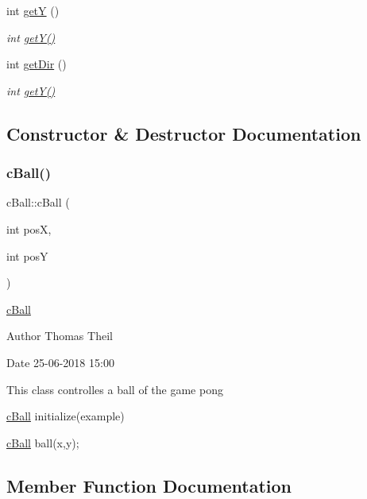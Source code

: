 \begin{DoxyCompactItemize}
int \mbox{\hyperlink{classc_ball_a4439db1ba25e8f69fde4fdf0fa1b4f24}{getY}} ()
\begin{DoxyCompactList}\small\item\em int \mbox{\hyperlink{classc_ball_a4439db1ba25e8f69fde4fdf0fa1b4f24}{get\+Y()}} \end{DoxyCompactList}\item 
int \mbox{\hyperlink{classc_ball_aabb4c1b801ca98f18461f0abebd22e41}{get\+Dir}} ()
\begin{DoxyCompactList}\small\item\em int \mbox{\hyperlink{classc_ball_a4439db1ba25e8f69fde4fdf0fa1b4f24}{get\+Y()}} \end{DoxyCompactList}\end{DoxyCompactItemize}


\subsection{Constructor \& Destructor Documentation}
\mbox{\label{classc_ball_a26865bcbfe3d50d5e938ec29eec791dd}} 
\subsubsection{\texorpdfstring{c\+Ball()}{cBall()}}
{\footnotesize\ttfamily c\+Ball\+::c\+Ball (\begin{DoxyParamCaption}\item[{int}]{posX,  }\item[{int}]{posY }\end{DoxyParamCaption})}



\mbox{\hyperlink{classc_ball}{c\+Ball}} 

\begin{DoxyAuthor}{Author}
Thomas Theil 
\end{DoxyAuthor}
\begin{DoxyDate}{Date}
25-\/06-\/2018 15\+:00
\end{DoxyDate}
This class controlles a ball of the game pong

\mbox{\hyperlink{classc_ball}{c\+Ball}} initialize(example) 
\begin{DoxyCode}
\mbox{\hyperlink{classc_ball}{cBall}} ball(x,y);
\end{DoxyCode}
 

\subsection{Member Function Documentation}
\mbox{\label{classc_ball_a34a6133cf86c6a333ae9b14eef4d3f99}} 

